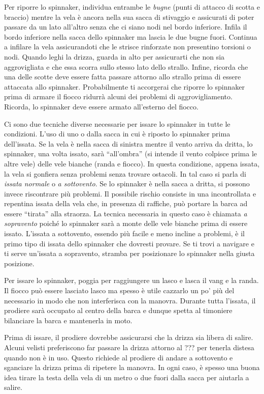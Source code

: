 Per riporre lo spinnaker, individua entrambe le \emph {bugne} (punti di attacco
di scotta e braccio) mentre la vela è ancora nella sua sacca di stivaggio e
assicurati di poter passare da un lato all'altro senza che ci siano nodi nel
bordo inferiore. Infila il bordo inferiore nella sacca dello spinnaker ma lascia
le due bugne fuori. Continua a infilare la vela assicurandoti che le strisce
rinforzate non presentino torsioni o nodi. Quando leghi la drizza, guarda in
alto per assicurarti che non sia aggrovigliata e che essa scorra sullo stesso
lato dello strallo. Infine, ricorda che una delle scotte deve essere fatta passare
attorno allo strallo prima di essere attaccata allo spinnaker. Probabilmente ti
accorgerai che riporre lo spinnaker prima di armare il fiocco ridurrà alcuni dei
problemi di aggrovigliamento. Ricorda, lo spinnaker deve essere armato
all'esterno del fiocco.

Ci sono due tecniche diverse necessarie per issare lo spinnaker in tutte le
condizioni. L'uso di uno o dalla sacca in cui è riposto lo spinnaker prima
dell'issata. Se la vela è nella sacca di sinistra mentre il vento arriva da
dritta, lo spinnaker, una volta issato, sarà ``all'ombra'' (si intende il vento
colpisce prima le altre vele) delle vele bianche (randa e fiocco). In questa
condizione, appena issata, la vela si gonfiera senza problemi senza trovare
ostacoli. In tal caso si parla di \emph{issata normale} o \emph{a sottovento}.
%
Se lo spinnaker è nella sacca a dritta, si possono invece riscontrare più
problemi. Il possibile rischio consiste in una incontrollata e repentina issata
della vela che, in presenza di raffiche, può portare la barca ad essere
``tirata'' alla straorza. La tecnica necessaria in questo caso è chiamata
\emph{a sopravento} poiché lo spinnaker sarà a monte delle vele bianche prima di
essere issato. L'issata a sottovento, essendo più facile e meno incline a
problemi, è il primo tipo di issata dello spinnaker che dovresti provare. Se
ti trovi a navigare e ti serve un'issata a sopravento, stramba per posizionare
lo spinnaker nella giusta posizione.

Per issare lo spinnaker, poggia per raggiungere un lasco e lasca il vang e la
randa. Il fiocco può essere lasciato lasco ma spesso è utile cazzarlo un po' più
del necessario in modo che non interferisca con la manovra. Durante tutta
l'issata, il prodiere sarà occupato al centro della barca
e dunque spetta al timoniere bilanciare la barca e mantenerla in moto.

Prima di issare, il prodiere dovrebbe assicurarsi che la drizza sia libera di
salire. Alcuni velisti preferiscono far passare la drizza attorno al ???
per tenerla distesa quando non è in uso. Questo richiede al prodiere di andare a
sottovento e sganciare la drizza prima di ripetere la manovra. In ogni caso, è
spesso una buona idea tirare la testa della vela di un metro o due fuori dalla
sacca per aiutarla a salire.

